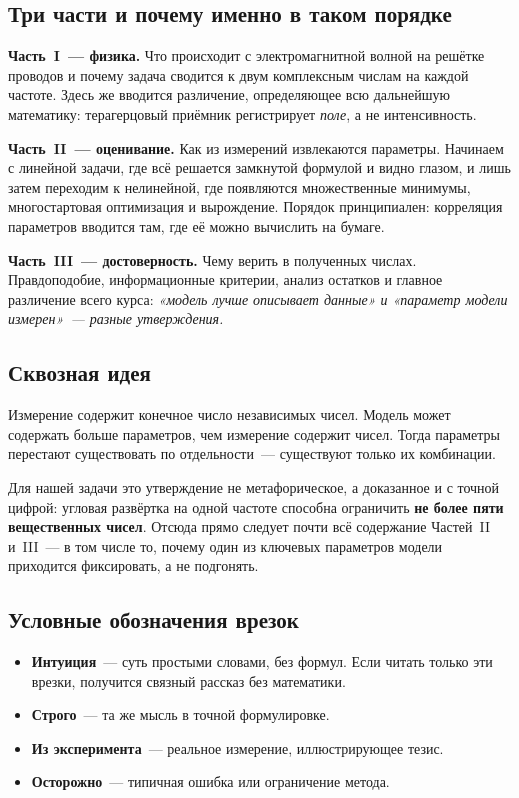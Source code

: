 \subsection*{Три части и почему именно в таком порядке}

\textbf{Часть~I~--- физика.} Что происходит с электромагнитной волной на решётке проводов и
почему задача сводится к двум комплексным числам на каждой частоте. Здесь же вводится
различение, определяющее всю дальнейшую математику: терагерцовый приёмник регистрирует
\emph{поле}, а не интенсивность.

\textbf{Часть~II~--- оценивание.} Как из измерений извлекаются параметры. Начинаем с линейной
задачи, где всё решается замкнутой формулой и видно глазом, и лишь затем переходим к
нелинейной, где появляются множественные минимумы, многостартовая оптимизация и вырождение.
Порядок принципиален: корреляция параметров вводится там, где её можно вычислить на бумаге.

\textbf{Часть~III~--- достоверность.} Чему верить в полученных числах. Правдоподобие,
информационные критерии, анализ остатков и главное различение всего курса:
\emph{«модель лучше описывает данные» и «параметр модели измерен»~--- разные утверждения.}

\subsection*{Сквозная идея}

\begin{tcolorbox}[enhanced,colback=cS1!7,colframe=cS1,boxrule=0pt,leftrule=3pt,arc=1pt]
Измерение содержит конечное число независимых чисел. Модель может содержать больше параметров,
чем измерение содержит чисел. Тогда параметры перестают существовать по отдельности~---
существуют только их комбинации.
\end{tcolorbox}

\noindent
Для нашей задачи это утверждение не метафорическое, а доказанное и с точной цифрой: угловая
развёртка на одной частоте способна ограничить \textbf{не более пяти вещественных чисел}. Отсюда
прямо следует почти всё содержание Частей~II и~III~--- в том числе то, почему один из ключевых
параметров модели приходится фиксировать, а не подгонять.

\subsection*{Условные обозначения врезок}

\begin{itemize}[leftmargin=1.4em,itemsep=0.3em]
  \item \textbf{\color{cAccent}Интуиция}~--- суть простыми словами, без формул. Если читать
        только эти врезки, получится связный рассказ без математики.
  \item \textbf{\color{cInk}Строго}~--- та же мысль в точной формулировке.
  \item \textbf{\color{cS3!70!black}Из эксперимента}~--- реальное измерение, иллюстрирующее
        тезис.
  \item \textbf{\color{cS2}Осторожно}~--- типичная ошибка или ограничение метода.
\end{itemize}

